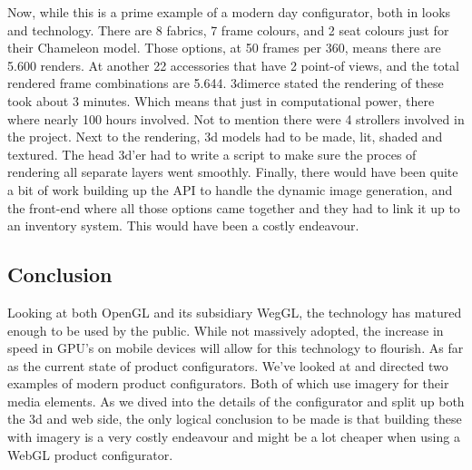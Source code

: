 Now, while this is a prime example of a modern day configurator, both in looks and technology. There are 8 fabrics, 7 frame colours, and 2 seat colours just for their Chameleon model. Those options, at 50 frames per 360, means there are 5.600 renders. At another 22 accessories that have 2 point-of views, and the total rendered frame combinations are 5.644. 3dimerce stated the rendering of these took about 3 minutes. Which means that just in computational power, there where nearly 100 hours involved. Not to mention there were 4 strollers involved in the project.
Next to the rendering, 3d models had to be made, lit, shaded and textured. The head 3d'er had to write a script to make sure the proces of rendering all separate layers went smoothly.
Finally, there would have been quite a bit of work building up the API to handle the dynamic image generation, and the front-end where all those options came together and they had to link it up to an inventory system.
This would have been a costly endeavour.

\subsection{Conclusion}
Looking at both OpenGL and its subsidiary WegGL, the technology has matured enough to be used by the public. While not massively adopted, the increase in speed in GPU's on mobile devices will allow for this technology to flourish.
As far as the current state of product configurators. We've looked at and directed two examples of modern product configurators. Both of which use imagery for their media elements. As we dived into the details of the configurator and split up both the 3d and web side, the only logical conclusion to be made is that building these with imagery is a very costly endeavour and might be a lot cheaper when using a WebGL product configurator.

\newpage